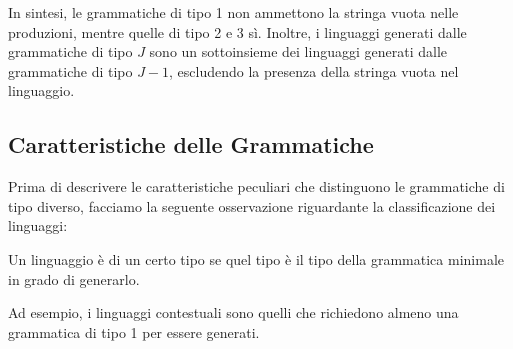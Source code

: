\documentclass{article}
\begin{document}
In sintesi, le grammatiche di tipo 1 non ammettono la stringa vuota nelle produzioni, mentre quelle di tipo 2 e 3 sì. Inoltre, i linguaggi generati dalle grammatiche di tipo \( J \) sono un sottoinsieme dei linguaggi generati dalle grammatiche di tipo \( J-1 \), escludendo la presenza della stringa vuota nel linguaggio.
\subsection{Caratteristiche delle Grammatiche}

Prima di descrivere le caratteristiche peculiari che distinguono le grammatiche di tipo diverso, facciamo la seguente osservazione riguardante la classificazione dei linguaggi:
\\\noindent
\begin{definition}
Un linguaggio è di un certo tipo se quel tipo è il tipo della grammatica minimale in grado di generarlo.
\end{definition}
\noindent Ad esempio, i linguaggi contestuali sono quelli che richiedono almeno una grammatica di tipo 1 per essere generati.
\\\noindent
\end{document}
